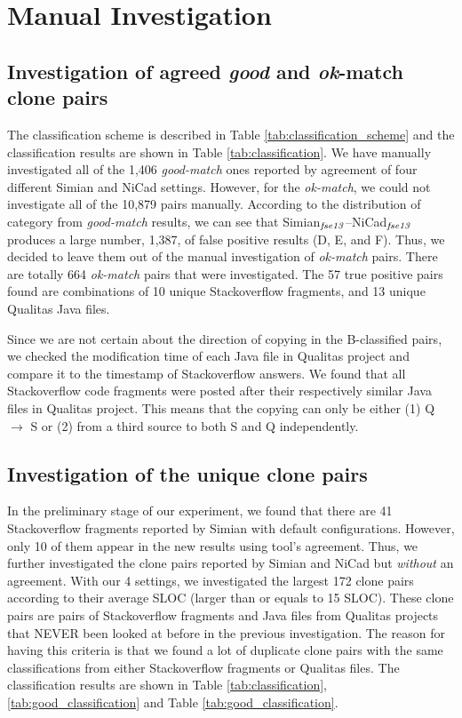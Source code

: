 \documentclass{IEEEtran}
\begin{document}
\section*{Manual Investigation}

\subsection{Investigation of agreed \textit{good} and \textit{ok}-match clone pairs}
The classification scheme is described in Table \ref{tab:classification_scheme} and the classification results are shown in Table \ref{tab:classification}. We have manually investigated all of the 1,406 \textit{good-match} ones reported by agreement of four different Simian and NiCad settings.  However, for the \textit{ok-match}, we could not investigate all of the 10,879 pairs manually.  According to the distribution of category from \textit{good-match} results, we can see that Simian$_{\textrm{\textit{fse13}}}$--NiCad$_{\textrm{\textit{fse13}}}$ produces a large number, 1,387, of false positive results (D, E, and F). Thus, we decided to leave them out of the manual investigation of \textit{ok-match} pairs. There are totally 664 \textit{ok-match} pairs that were investigated. The 57 true positive pairs found are combinations of 10 unique Stackoverflow fragments, and 13 unique Qualitas Java files.

Since we are not certain about the direction of copying in the B-classified pairs, we checked the modification time of each Java file in Qualitas project and compare it to the timestamp of Stackoverflow answers. We found that all Stackoverflow code fragments were posted after their respectively similar Java files in Qualitas project. This means that the copying can only be either (1) Q $\rightarrow$ S or (2) from a third source to both S and Q independently.

\subsection{Investigation of the unique clone pairs}
In the preliminary stage of our experiment, we found that there are 41 Stackoverflow fragments reported by Simian with default configurations. However, only 10 of them appear in the new results using tool's agreement. Thus, we further investigated the clone pairs reported by Simian and NiCad but \textit{without} an agreement. With our 4 settings, we investigated the largest 172 clone pairs according to their average SLOC (larger than or equals to 15 SLOC). These clone pairs are pairs of Stackoverflow fragments and Java files from Qualitas projects that NEVER been looked at before in the previous investigation. The reason for having this criteria is that we found a lot of duplicate clone pairs with the same classifications from either Stackoverflow fragments or Qualitas files. The classification results are shown in Table \ref{tab:classification}, \ref{tab:good_classification} and Table \ref{tab:good_classification}. 
\end{document}

